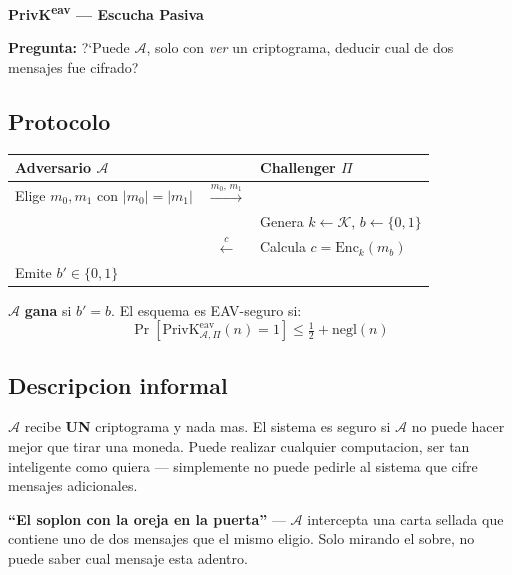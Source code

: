 \documentclass[a4paper,11pt]{article}
\begin{document}
\begin{tcolorbox}[
  enhanced, breakable,
  colback=white, colframe=itbaBlue,
  borderline west={3pt}{0pt}{itbaBlue},
  sharp corners, drop shadow,
  top=4mm, left=4mm, right=4mm, bottom=4mm,
]
{\color{itbaBlue}\large\bfseries PrivK\textsuperscript{eav} --- Escucha Pasiva}\par\vspace{4pt}
\textbf{Pregunta:} ?`Puede $\mathcal{A}$, solo con \emph{ver} un criptograma, deducir cual de dos mensajes fue cifrado?
\end{tcolorbox}

\vspace{0.5cm}

\subsection{Protocolo}

\begin{center}
\begin{tabular}{ACB}
\toprule
\textbf{Adversario $\mathcal{A}$} & & \textbf{Challenger $\Pi$} \\
\midrule
Elige $m_0, m_1$ con $|m_0|=|m_1|$ & $\xrightarrow{m_0,\,m_1}$ & \\
 & & Genera $k \leftarrow \mathcal{K}$, $b \leftarrow \{0,1\}$ \\
 & $\xleftarrow{c}$ & Calcula $c = \mathrm{Enc}_k(m_b)$ \\
Emite $b' \in \{0,1\}$ & & \\
\bottomrule
\end{tabular}
\end{center}

\vspace{0.3cm}
$\mathcal{A}$ \textbf{gana} si $b' = b$. El esquema es EAV-seguro si:
\[
  \Pr[\text{PrivK}^{\mathrm{eav}}_{\mathcal{A},\Pi}(n) = 1] \leq \tfrac{1}{2} + \mathrm{negl}(n)
\]

\subsection{Descripcion informal}

$\mathcal{A}$ recibe \textbf{UN} criptograma y nada mas. El sistema es seguro si $\mathcal{A}$ no puede hacer mejor que tirar una moneda. Puede realizar cualquier computacion, ser tan inteligente como quiera --- simplemente no puede pedirle al sistema que cifre mensajes adicionales.

\begin{hookbox}
\textbf{``El soplon con la oreja en la puerta''} --- $\mathcal{A}$ intercepta una carta sellada que contiene uno de dos mensajes que el mismo eligio. Solo mirando el sobre, no puede saber cual mensaje esta adentro.
\end{hookbox}
\end{document}

